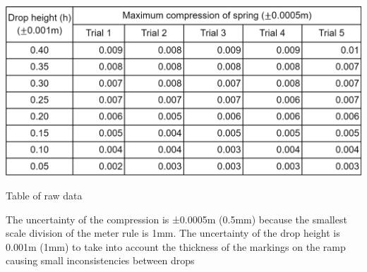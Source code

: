 \FloatBarrier
\begin{table}[!htb]
    \includegraphics[width = \textwidth]{rawtbl.png}
    \caption{Table of raw data}
\end{table}
\FloatBarrier
The uncertainty of the compression is ±0.0005m (0.5mm) because the smallest scale division of the meter rule is 1mm. The uncertainty of the drop height is 0.001m (1mm) to take into account the thickness of the markings on the ramp causing small inconsistencies between drops